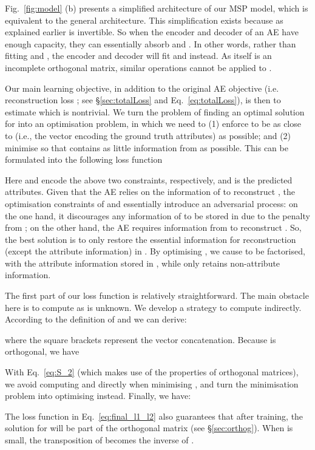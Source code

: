 \documentclass{article}
\begin{document}
Fig.~\ref{fig:model} (b) presents a simplified architecture of our MSP model, which is equivalent to the general architecture. This simplification exists because as explained earlier  is invertible. So  when the encoder and decoder of an AE have enough capacity, they can essentially absorb  and . In other words, rather than fitting  and , the encoder and decoder will fit  and  instead. As  itself is an incomplete orthogonal matrix, similar operations cannot be applied to . 



Our main learning objective, in addition to the original AE objective (i.e. reconstruction loss ; see \S\ref{sec:totalLoss} and Eq.~\ref{eq:totalLoss}), is then to estimate  which is nontrivial. We turn the problem of finding an optimal solution for  into an optimisation problem, in which we need to (1) enforce  to be as close to  (i.e., the vector encoding the ground truth attributes) as possible; and (2) minimise   so that  contains as little information from  as possible. This can be formulated into the following loss function 

Here  and  encode the above two constraints, respectively, and  is the predicted attributes. 
Given that the AE relies on the information of  to reconstruct , the optimisation constraints of  and  essentially introduce an adversarial process: on the one hand, it discourages any information of  to be stored in  due to the penalty from ; on the other hand, the AE requires information from  to reconstruct .
So, the best solution is to only restore the essential information for reconstruction (except the attribute information) in . 
By optimising , we cause  to be factorised, with the attribute information stored in , while  only retains non-attribute information. 


The first part of our loss function  is relatively straightforward. The main obstacle here is to compute  as  is unknown. We develop a strategy to compute  indirectly. According to the definition of  and  we can derive:

where the square brackets represent the vector concatenation.
Because  is orthogonal, we have

With Eq.~\ref{eq:S_2} (which makes use of the properties of orthogonal matrices), we avoid computing  and  directly when minimising , and turn the minimisation problem into optimising  instead. 
Finally, we have:


The loss function in Eq.~\ref{eq:final_l1_l2} also guarantees that after training, the solution for  will be part of the orthogonal matrix  (see \S\ref{sec:orthog}). When  is small, the transposition of  becomes the inverse of .
\end{document}
